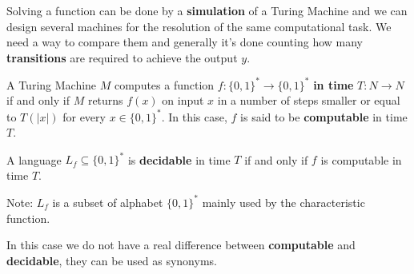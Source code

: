 Solving a function can be done by a \textbf{simulation} of a Turing Machine and we can design several machines for the resolution of the same computational task.
We need a way to compare them and generally it's done counting how many \textbf{transitions} are required to achieve the output $y$.
\begin{definition}
    A Turing Machine $M$ computes a function $f: \{0,1\}^* \rightarrow \{0,1\}^*$ \textbf{in time} $T: N \rightarrow N$ if and only if $M$ returns $f(x)$ on input 
    $x$ in a number of steps smaller or equal to $T(|x|)$ for every $x \in \{0,1\}^*$. In this case, $f$ is said to be \textbf{computable} in time $T$.
\end{definition}
\begin{definition}
    A language $L_f \subseteq \{0,1\}^*$ is \textbf{decidable} in time $T$ if and only if $f$ is computable in time $T$.
\end{definition}
Note: $L_f$ is a subset of alphabet $\{0,1\}^*$ mainly used by the characteristic function. \vspace{7pt}

In this case we do not have a real difference between \textbf{computable} and \textbf{decidable}, they can be used as synonyms.